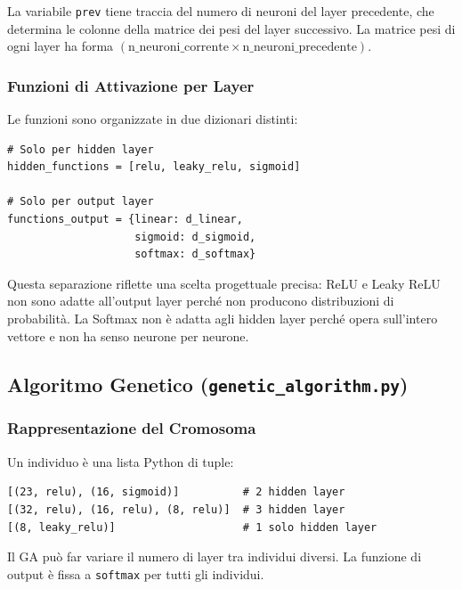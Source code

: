 \documentclass[12pt, a4paper]{article}
\begin{document}
La variabile \texttt{prev} tiene traccia del numero di neuroni del layer
precedente, che determina le colonne della matrice dei pesi del layer
successivo. La matrice pesi di ogni layer ha forma
$(\text{n\_neuroni\_corrente} \times \text{n\_neuroni\_precedente})$.

\subsubsection{Funzioni di Attivazione per Layer}

Le funzioni sono organizzate in due dizionari distinti:

\begin{lstlisting}[caption={Separazione tra funzioni per hidden e output layer}]
# Solo per hidden layer
hidden_functions = [relu, leaky_relu, sigmoid]

# Solo per output layer
functions_output = {linear: d_linear,
                    sigmoid: d_sigmoid,
                    softmax: d_softmax}
\end{lstlisting}

Questa separazione riflette una scelta progettuale precisa: ReLU e Leaky ReLU
non sono adatte all'output layer perché non producono distribuzioni di
probabilità. La Softmax non è adatta agli hidden layer perché opera sull'intero
vettore e non ha senso neurone per neurone.

\subsection{Algoritmo Genetico (\texttt{genetic\_algorithm.py})}

\subsubsection{Rappresentazione del Cromosoma}

Un individuo è una lista Python di tuple:

\begin{lstlisting}[caption={Esempi di cromosomi}]
[(23, relu), (16, sigmoid)]          # 2 hidden layer
[(32, relu), (16, relu), (8, relu)]  # 3 hidden layer
[(8, leaky_relu)]                    # 1 solo hidden layer
\end{lstlisting}

Il GA può far variare il numero di layer tra individui diversi. La funzione
di output è fissa a \texttt{softmax} per tutti gli individui.
\end{document}
